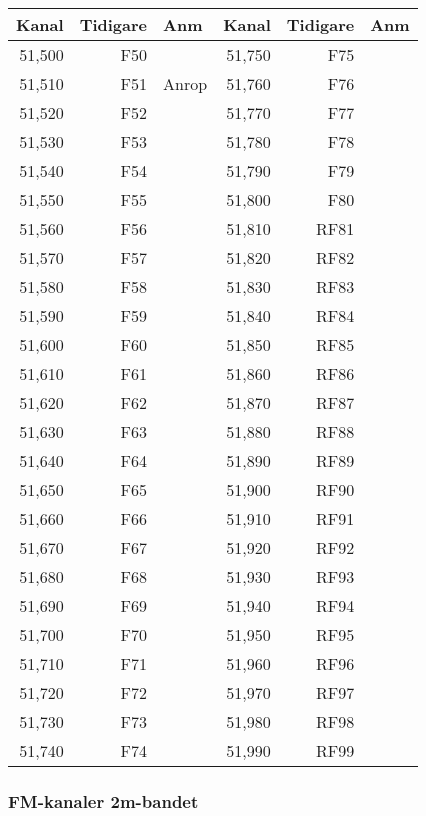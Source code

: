 \begin{longtable}{rrl|rrl}
\textbf{Kanal} & \textbf{Tidigare} & \textbf{Anm}
&  \textbf{Kanal} & \textbf{Tidigare} & \textbf{Anm} \\ \hline
	51,500 &      F50 &       & 51,750 &      F75 &  \\
	51,510 &      F51 & Anrop & 51,760 &      F76 &  \\
	51,520 &      F52 &       & 51,770 &      F77 &  \\
	51,530 &      F53 &       & 51,780 &      F78 &  \\
	51,540 &      F54 &       & 51,790 &      F79 &  \\
	51,550 &      F55 &       & 51,800 &      F80 &  \\
	51,560 &      F56 &       & 51,810 &     RF81 &  \\
	51,570 &      F57 &       & 51,820 &     RF82 &  \\
	51,580 &      F58 &       & 51,830 &     RF83 &  \\
	51,590 &      F59 &       & 51,840 &     RF84 &  \\
	51,600 &      F60 &       & 51,850 &     RF85 &  \\
	51,610 &      F61 &       & 51,860 &     RF86 &  \\
	51,620 &      F62 &       & 51,870 &     RF87 &  \\
	51,630 &      F63 &       & 51,880 &     RF88 &  \\
	51,640 &      F64 &       & 51,890 &     RF89 &  \\
	51,650 &      F65 &       & 51,900 &     RF90 &  \\
	51,660 &      F66 &       & 51,910 &     RF91 &  \\
	51,670 &      F67 &       & 51,920 &     RF92 &  \\
	51,680 &      F68 &       & 51,930 &     RF93 &  \\
	51,690 &      F69 &       & 51,940 &     RF94 &  \\
	51,700 &      F70 &       & 51,950 &     RF95 &  \\
	51,710 &      F71 &       & 51,960 &     RF96 &  \\
	51,720 &      F72 &       & 51,970 &     RF97 &  \\
	51,730 &      F73 &       & 51,980 &     RF98 &  \\
	51,740 &      F74 &       & 51,990 &     RF99 &
\end{longtable}

\subsubsection{FM-kanaler 2m-bandet}

